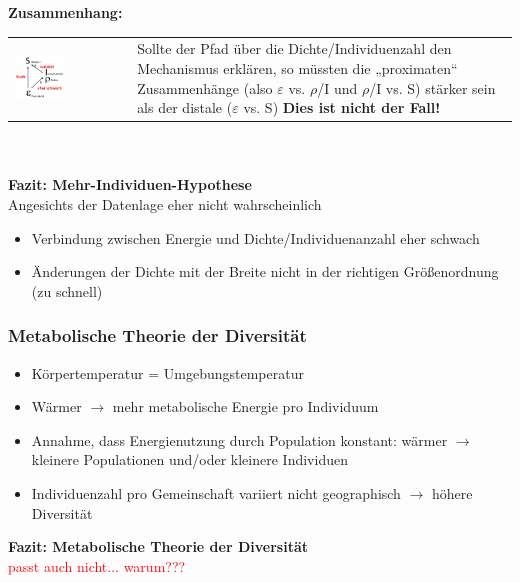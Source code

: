 \textbf{Zusammenhang:}\\
\begin{tabularx}{\textwidth}{p{}p{}}
\includegraphics[width=0.45\textwidth]{lectures/DS2/pix/pic1.png} &
Sollte der Pfad über die Dichte/Individuenzahl den Mechanismus erklären, so müssten die „proximaten“ Zusammenhänge (also $\varepsilon$ vs. $\rho$/I und $\rho$/I vs. S) stärker sein als der distale ($\varepsilon$ vs. S) \textbf{Dies ist nicht der Fall!}
\end{tabularx}
\\\\
\textbf{Fazit: Mehr-Individuen-Hypothese}\\
Angesichts der Datenlage eher nicht wahrscheinlich
\begin{itemize}
	\item Verbindung zwischen Energie und Dichte/Individuenanzahl eher schwach
	\item Änderungen der Dichte mit der Breite nicht in der richtigen Größenordnung (zu schnell)
\end{itemize}

\newpage
\subsubsection{Metabolische Theorie der Diversität}
\begin{itemize}
	\item Körpertemperatur = Umgebungstemperatur
	\item Wärmer $\rightarrow$ mehr metabolische Energie pro Individuum
	\item Annahme, dass Energienutzung durch Population konstant: wärmer $\rightarrow$ kleinere Populationen und/oder kleinere Individuen
	\item Individuenzahl pro Gemeinschaft variiert nicht geographisch $\rightarrow$ höhere Diversität
\end{itemize}

\textbf{Fazit: Metabolische Theorie der Diversität}\\
\textcolor{red}{passt auch nicht... warum???}

